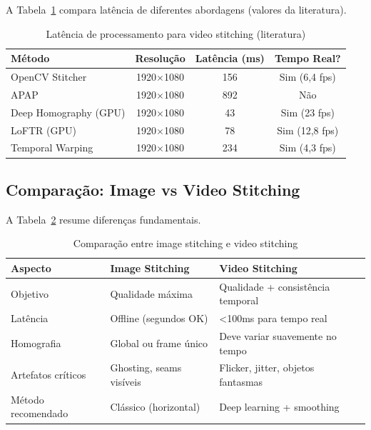 A Tabela~\ref{tab:video_latency} compara latência de diferentes abordagens (valores da literatura).

\begin{table}[htb]
\centering
\caption{Latência de processamento para video stitching (literatura)}
\label{tab:video_latency}
\small
\begin{tabular}{lccc}
\hline
\textbf{Método} & \textbf{Resolução} & \textbf{Latência (ms)} & \textbf{Tempo Real?} \\ \hline
OpenCV Stitcher & 1920$\times$1080 & 156 & Sim (6,4 fps) \\
APAP & 1920$\times$1080 & 892 & Não \\
Deep Homography (GPU) & 1920$\times$1080 & 43 & Sim (23 fps) \\
LoFTR (GPU) & 1920$\times$1080 & 78 & Sim (12,8 fps) \\
Temporal Warping & 1920$\times$1080 & 234 & Sim (4,3 fps) \\
\hline
\end{tabular}
\end{table}

\subsection{Comparação: Image vs Video Stitching}

A Tabela~\ref{tab:image_vs_video} resume diferenças fundamentais.

\begin{table}[htb]
\centering
\caption{Comparação entre image stitching e video stitching}
\label{tab:image_vs_video}
\small
\begin{tabular}{p{3cm}p{5cm}p{5cm}}
\hline
\textbf{Aspecto} & \textbf{Image Stitching} & \textbf{Video Stitching} \\ \hline
Objetivo & Qualidade máxima & Qualidade + consistência temporal \\
Latência & Offline (segundos OK) & <100ms para tempo real \\
Homografia & Global ou frame único & Deve variar suavemente no tempo \\
Artefatos críticos & Ghosting, seams visíveis & Flicker, jitter, objetos fantasmas \\
Método recomendado & Clássico (horizontal) & Deep learning + smoothing \\
\hline
\end{tabular}
\end{table}

